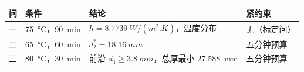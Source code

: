 \begin{tabular}{clll}
  \toprule
    问 & 条件 & 结论 & 紧约束 \\
  \midrule
    一 & \SI{75}{\celsius}，\SI{90}{min} & $h=\SI{8.7739}{W/(m^2.K)}$，温度分布 & 无（标定问） \\
    二 & \SI{65}{\celsius}，\SI{60}{min} & $d_2^{*}=\SI{18.16}{mm}$ & 五分钟预算 \\
    三 & \SI{80}{\celsius}，\SI{30}{min} & 前沿 $d_4\ge\SI{3.8}{mm}$，总厚最小 \SI{27.588}{mm} & 五分钟预算 \\
  \bottomrule
\end{tabular}
